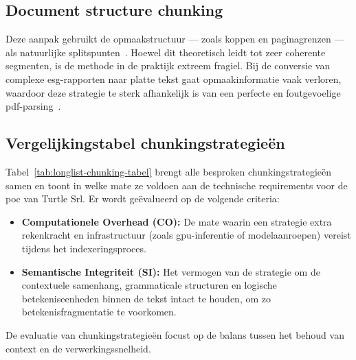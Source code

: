 \subsection{Document structure chunking}

Deze aanpak gebruikt de opmaakstructuur — zoals koppen en paginagrenzen — als natuurlijke splitspunten~\autocite{Taiwo2026}. Hoewel dit theoretisch leidt tot zeer coherente segmenten, is de methode in de praktijk extreem fragiel. Bij de conversie van complexe \gls{esg}-rapporten naar platte tekst gaat opmaakinformatie vaak verloren, waardoor deze strategie te sterk afhankelijk is van een perfecte en foutgevoelige \gls{pdf}-parsing~\autocite{Amiri2025}.

\subsection{Vergelijkingstabel chunkingstrategieën}

Tabel~\ref{tab:longlist-chunking-tabel} brengt alle besproken chunkingstrategieën samen en toont in welke mate ze voldoen aan de technische requirements voor de \gls{poc} van Turtle Srl. Er wordt geëvalueerd op de volgende criteria:

\begin{itemize}
  \item \textbf{Computationele Overhead (CO):} De mate waarin een strategie extra rekenkracht en infrastructuur (zoals \gls{gpu}-inferentie of modelaanroepen) vereist tijdens het indexeringsproces.
  \item \textbf{Semantische Integriteit (SI):} Het vermogen van de strategie om de contextuele samenhang, grammaticale structuren en logische betekeniseenheden binnen de tekst intact te houden, om zo betekenisfragmentatie te voorkomen.
\end{itemize}

De evaluatie van chunkingstrategieën focust op de balans tussen het behoud van context en de verwerkingssnelheid.

